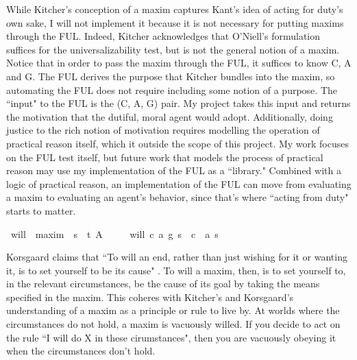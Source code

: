 \begin{isabellebody}
\begin{isamarkuptext}
While Kitcher's conception of a maxim captures Kant's idea of acting for duty's own sake, I will not implement it 
because it is not necessary for putting maxims through the FUL. Indeed, Kitcher acknowledges that 
O'Niell's formulation suffices for the universalizability test, but is not the general notion of a maxim.
Notice that in order to pass the maxim through the FUL, it suffices to know C, A and G. The FUL
derives the purpose that Kitcher bundles into the maxim, so automating the FUL does not require 
including some notion of a purpose. The ``input" to the FUL is the (C, A, G) pair. My project takes 
this input and returns the motivation that the dutiful, moral agent would adopt. Additionally, doing
justice to the rich notion of motivation requires modelling the operation of practical reason itself, 
which it outside the scope of this project. My work focuses on the FUL test itself, but future work that 
models the process of practical reason may use my implementation of the FUL as a ``library." Combined 
with a logic of practical reason, an implementation of the FUL can move from evaluating a maxim to 
evaluating an agent's behavior, since that's where ``acting from duty" starts to matter.%
\end{isamarkuptext}\isamarkuptrue%
\isamarkupfalse%
\ will\ {\isacharcolon}{\isacharcolon}\ {\isachardoublequoteopen}maxim\ {\isasymRightarrow}\ s{\isasymRightarrow}\ \ t{\isachardoublequoteclose}\ {\isacharparenleft}{\isachardoublequoteopen}A\ {\isacharunderscore}\ {\isacharunderscore}{\isachardoublequoteclose}{\isacharparenright}\isanewline
\ \ \ {\isachardoublequoteopen}will\ {\isacharparenleft}c{\isacharcomma}\ a{\isacharcomma}\ g{\isacharparenright}\ s\ {\isacharequal}\ {\isacharparenleft}c\ \isactrlbold {\isasymrightarrow}\ {\isacharparenleft}a\ s{\isacharparenright}{\isacharparenright}{\isachardoublequoteclose}%
\begin{isamarkuptext}%
Korsgaard claims that ``To will an end, rather than just
wishing for it or wanting it, is to set yourself to be its cause" \cite{sources}. To will a maxim, then, 
is to set yourself to, in the relevant circumstances, be the cause of its goal by taking the means 
specified in the maxim. This coheres with 
Kitcher's and Korsgaard's understanding of a maxim as a principle or rule to live by. At worlds 
where the circumstances do not hold, a maxim is vacuously willed. If you decide to act on the rule ``I will 
do X in these cirumstances", then you are vacuously obeying it when the circumstances don't hold.  


\end{isamarkuptext}
\end{isabellebody}
